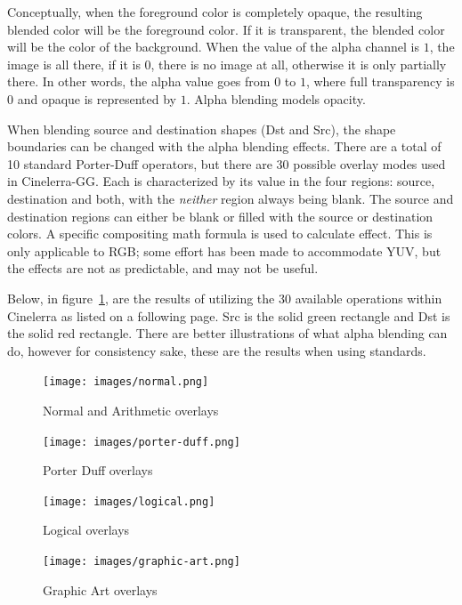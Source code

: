 Conceptually, when the foreground color is completely opaque, the resulting blended color will be the foreground color.  If it is transparent, the blended color will be the color of the background.  When the value of the alpha channel is $1$, the image is all there, if it is $0$, there is no image at all, otherwise it is only partially there.  In other words, the alpha value goes from $0$ to $1$, where full transparency is $0$ and opaque is represented by $1$.  Alpha blending models opacity. 

When blending source and destination shapes (Dst and Src), the shape boundaries can be changed with the alpha blending effects.  There are a total of 10 standard Porter-Duff operators, but there are 30 possible overlay modes used in Cinelerra-GG.  Each is characterized by its value in the four regions: source, destination and both, with the \textit{neither} region always being blank.  The source and destination regions can either be blank or filled with the source or destination colors.  A specific compositing math formula is used to calculate effect.  This is only applicable to RGB; some effort has been made to accommodate YUV, but the effects are not as predictable, and may not be useful. 

Below, in figure~\ref{fig:normal}, are the results of utilizing the 30 available operations within Cinelerra as listed on a following page.  Src is the solid green rectangle and Dst is the solid red rectangle.  There are better illustrations of what alpha blending can do, however for consistency sake, these are the results when using standards.

\begin{figure}[htpb]
    \centering
    \texttt{[image: images/normal.png]}
    \caption{Normal and Arithmetic overlays}
    \label{fig:normal}
\end{figure}

\begin{figure}[htpb]
    \centering
    \texttt{[image: images/porter-duff.png]}
    \caption{Porter Duff overlays}
\end{figure}

\begin{figure}[htpb]
    \centering
    \texttt{[image: images/logical.png]}
    \caption{Logical overlays}
\end{figure}

\begin{figure}[htpb]
    \centering
    \texttt{[image: images/graphic-art.png]}
    \caption{Graphic Art overlays}
\end{figure}

